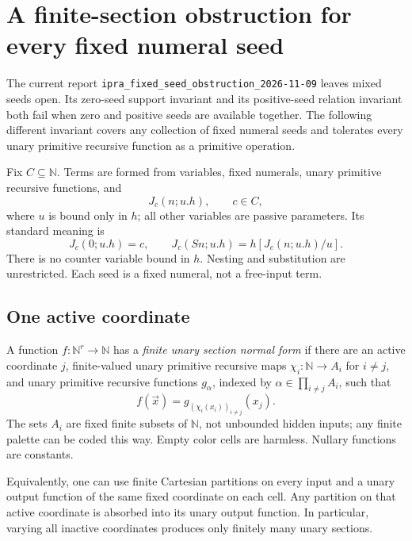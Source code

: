 \section{A finite-section obstruction for every fixed numeral seed}

The current report \texttt{ipra\_fixed\_seed\_obstruction\_2026-11-09}
leaves mixed seeds open. Its zero-seed support invariant and its
positive-seed relation invariant both fail when zero and positive seeds
are available together. The following different invariant covers any
collection of fixed numeral seeds and tolerates every unary primitive
recursive function as a primitive operation.

Fix \(C\subseteq\mathbb N\). Terms are formed from variables, fixed
numerals, unary primitive recursive functions, and
\[
 J_c(n;u.h),\qquad c\in C,
\]
where \(u\) is bound only in \(h\); all other variables are passive
parameters. Its standard meaning is
\[
 J_c(0;u.h)=c,\qquad J_c(Sn;u.h)=h[J_c(n;u.h)/u].
\]
There is no counter variable bound in \(h\). Nesting and substitution
are unrestricted. Each seed is a fixed numeral, not a free-input term.

\subsection{One active coordinate}

\begin{definition}
A function \(f:\mathbb N^r\to\mathbb N\) has a \emph{finite unary section
normal form} if there are an active coordinate \(j\), finite-valued unary
primitive recursive maps \(\chi_i:\mathbb N\to A_i\) for \(i\ne j\), and
unary primitive recursive functions \(g_\alpha\), indexed by
\(\alpha\in\prod_{i\ne j}A_i\), such that
\[
 f(\vec x)=g_{(\chi_i(x_i))_{i\ne j}}(x_j).                 \tag{FS}
\]
The sets \(A_i\) are fixed finite subsets of \(\mathbb N\), not
unbounded hidden inputs; any finite palette can be coded this way.
Empty color cells are harmless. Nullary functions are constants.
\end{definition}

Equivalently, one can use finite Cartesian partitions on every input
and a unary output function of the same fixed coordinate on each cell.
Any partition on that active coordinate is absorbed into its unary
output function. In particular, varying all inactive coordinates
produces only finitely many unary sections.

